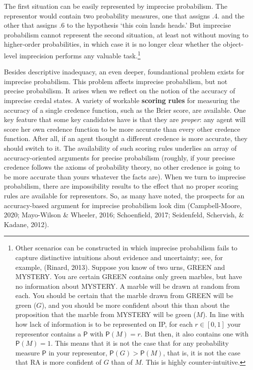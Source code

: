 \documentclass[
  10pt,
  dvipsnames,enabledeprecatedfontcommands]{scrartcl}
\newcommand{\pr}[1]{\mathsf{P}(#1)}
\begin{document}
\noindent The first situation can be easily represented by imprecise
probabilism. The representor would contain two probability measures, one
that assigns .4. and the other that assigns .6 to the hypothesis `this
coin lands heads.' But imprecise probabilism cannot represent the second
situation, at least not without moving to higher-order probabilities, in
which case it is no longer clear whether the object-level imprecision
performs any valuable task.\footnote{Other scenarios can be constructed
  in which imprecise probabilism fails to capture distinctive intuitions
  about evidence and uncertainty; see, for example, (Rinard, 2013).
  Suppose you know of two urns, \textsf{GREEN} and \textsf{MYSTERY}. You
  are certain \textsf{GREEN} contains only green marbles, but have no
  information about \textsf{MYSTERY}. A marble will be drawn at random
  from each. You should be certain that the marble drawn from
  \textsf{GREEN} will be green (\(G\)), and you should be more confident
  about this than about the proposition that the marble from
  \textsf{MYSTERY} will be green (\(M\)). In line with how lack of
  information is to be represented on \textsf{IP}, for each
  \(r\in [0,1]\) your representor contains a \(\mathsf{P}\) with
  \(\pr{M}=r\). But then, it also contains one with \(\pr{M}=1\). This
  means that it is not the case that for any probability measure
  \(\mathsf{P}\) in your representor, \(\mathsf{P}(G) > \mathsf{P}(M)\),
  that is, it is not the case that RA is more confident of \(G\) than of
  \(M\). This is highly counter-intuitive.}

Besides descriptive inadequacy, an even deeper, foundantional problem
exists for imprecise probabilism. This problem affects imprecise
probabilism, but not precise probabilism. It arises when we reflect on
the notion of the accuracy of imprecise credal states. A variety of
workable \textbf{scoring rules} for measuring the accuracy of a single
credence function, such as the Brier score, are available. One key
feature that some key candidates have is that they are \emph{proper}:
any agent will score her own credence function to be more accurate than
every other credence function. After all, if an agent thought a
different credence is more accurate, they should switch to it. The
availability of such scoring rules underlies an array of
accuracy-oriented arguments for precise probabilism (roughly, if your
precisse credence follows the axioms of probability theory, no other
credence is going to be more accurate than yours whatever the facts
are). When we turn to imprecise probabilism, there are impossibility
results to the effect that no proper scoring rules are available for
representors. So, as many have noted, the prospects for an
accuracy-based argument for imprecise probabilism look dim
(Campbell-Moore, 2020; Mayo-Wilson \& Wheeler, 2016; Schoenfield, 2017;
Seidenfeld, Schervish, \& Kadane, 2012).
\end{document}
